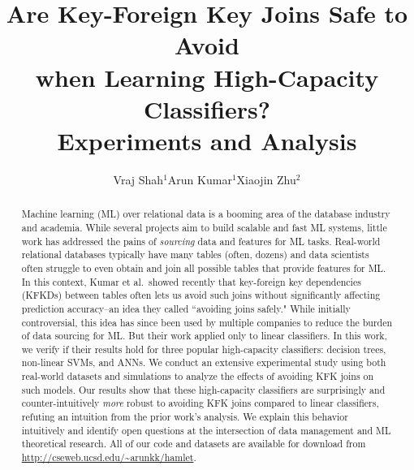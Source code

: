 \documentclass{vldb}
\title{Are Key-Foreign Key Joins Safe to Avoid \\when Learning High-Capacity Classifiers?\\ \lbrack Experiments and Analysis\rbrack }
\author{
\alignauthor Vraj Shah$^1$\hspace{20mm}Arun Kumar$^1$\hspace{20mm}Xiaojin Zhu$^2$\\
\affaddr{\vspace{2mm}$^1$University of California, San Diego\hspace{20mm}$^2$University of Wisconsin-Madison}
\email{\{vps002, arunkk\}@eng.ucsd.edu, jerryzhu@cs.wisc.edu}
}
\begin{document}
\maketitle

\begin{abstract}
Machine learning (ML) over relational data is a booming area of the database industry and 
academia. While several projects aim to build scalable and fast ML systems, little work has 
addressed the pains of \textit{sourcing} data and features for ML tasks. 
Real-world relational databases typically have many tables (often, dozens) and data scientists 
often struggle to even obtain and join all possible tables that provide features for ML. 
In this context, Kumar et al.~showed recently that key-foreign key dependencies (KFKDs) 
between tables often lets us avoid such joins without significantly affecting prediction 
accuracy--an idea they called ``avoiding joins safely." While initially controversial, this idea 
has since been used by multiple companies to reduce the burden of data sourcing for ML.
But their work applied only to linear classifiers. In this work, we verify if their results hold 
for three popular high-capacity classifiers: decision trees, non-linear SVMs, and ANNs. We conduct an 
extensive experimental study using both real-world datasets and simulations to analyze the 
effects of avoiding KFK joins on such models. Our results show that these high-capacity classifiers 
are surprisingly and counter-intuitively \textit{more} robust to avoiding KFK joins compared to 
linear classifiers, refuting an intuition from the prior work's analysis. We explain this behavior 
intuitively and identify open questions at the intersection of data management and ML 
theoretical research. All of our code and datasets are available for download from 
\url{http://cseweb.ucsd.edu/~arunkk/hamlet}.
\end{abstract}
\end{document}
